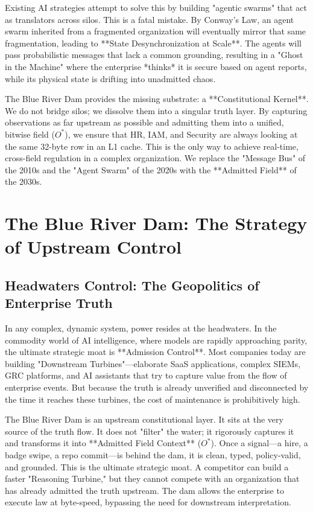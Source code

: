 \documentclass[12pt,a4paper,oneside]{book}
\begin{document}
Existing AI strategies attempt to solve this by building "agentic swarms" that act as translators across silos. This is a fatal mistake. By Conway's Law, an agent swarm inherited from a fragmented organization will eventually mirror that same fragmentation, leading to **State Desynchronization at Scale**. The agents will pass probabilistic messages that lack a common grounding, resulting in a "Ghost in the Machine" where the enterprise *thinks* it is secure based on agent reports, while its physical state is drifting into unadmitted chaos.

The Blue River Dam provides the missing substrate: a **Constitutional Kernel**. We do not bridge silos; we dissolve them into a singular truth layer. By capturing observations as far upstream as possible and admitting them into a unified, bitwise field ($O^*$), we ensure that HR, IAM, and Security are always looking at the same 32-byte row in an L1 cache. This is the only way to achieve real-time, cross-field regulation in a complex organization. We replace the "Message Bus" of the 2010s and the "Agent Swarm" of the 2020s with the **Admitted Field** of the 2030s.

\chapter{The Blue River Dam: The Strategy of Upstream Control}

\section{Headwaters Control: The Geopolitics of Enterprise Truth}
In any complex, dynamic system, power resides at the headwaters. In the commodity world of AI intelligence, where models are rapidly approaching parity, the ultimate strategic moat is **Admission Control**. Most companies today are building "Downstream Turbines"---elaborate SaaS applications, complex SIEMs, GRC platforms, and AI assistants that try to capture value from the flow of enterprise events. But because the truth is already unverified and disconnected by the time it reaches these turbines, the cost of maintenance is prohibitively high.

The Blue River Dam is an upstream constitutional layer. It sits at the very source of the truth flow. It does not "filter" the water; it rigorously captures it and transforms it into **Admitted Field Context** ($O^*$). Once a signal---a hire, a badge swipe, a repo commit---is behind the dam, it is clean, typed, policy-valid, and grounded. This is the ultimate strategic moat. A competitor can build a faster "Reasoning Turbine," but they cannot compete with an organization that has already admitted the truth upstream. The dam allows the enterprise to execute law at byte-speed, bypassing the need for downstream interpretation. 
\end{document}
